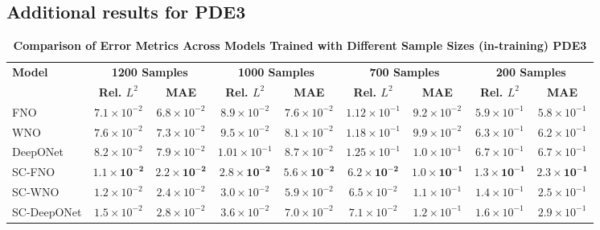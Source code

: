 \subsection*{Additional results for PDE3}

\begin{table}[htbp]
\centering
\caption{\scriptsize\textbf{Comparison of Error Metrics Across Models Trained with Different Sample Sizes (in-training) PDE3}}
\label{tab:pde3_forward_nostd}
\scriptsize
\setlength{\tabcolsep}{3pt}
\begin{tabular}{lcccccccc}
\hline
\textbf{Model} & \multicolumn{2}{c}{\textbf{1200 Samples}} & \multicolumn{2}{c}{\textbf{1000 Samples}} & \multicolumn{2}{c}{\textbf{700 Samples}} & \multicolumn{2}{c}{\textbf{200 Samples}} \\
 & \textbf{Rel. \(L^2\)} & \textbf{MAE} & \textbf{Rel. \(L^2\)} & \textbf{MAE} & \textbf{Rel. \(L^2\)} & \textbf{MAE} & \textbf{Rel. \(L^2\)} & \textbf{MAE} \\
\hline
FNO        & \(7.1 \times 10^{-2}\) & \(6.8 \times 10^{-2}\) & \(8.9 \times 10^{-2}\) & \(7.6 \times 10^{-2}\) & \(1.12 \times 10^{-1}\) & \(9.2 \times 10^{-2}\) & \(5.9 \times 10^{-1}\) & \(5.8 \times 10^{-1}\) \\
WNO        & \(7.6 \times 10^{-2}\) & \(7.3 \times 10^{-2}\) & \(9.5 \times 10^{-2}\) & \(8.1 \times 10^{-2}\) & \(1.18 \times 10^{-1}\) & \(9.9 \times 10^{-2}\) & \(6.3 \times 10^{-1}\) & \(6.2 \times 10^{-1}\) \\
DeepONet   & \(8.2 \times 10^{-2}\) & \(7.9 \times 10^{-2}\) & \(1.01 \times 10^{-1}\) & \(8.7 \times 10^{-2}\) & \(1.25 \times 10^{-1}\) & \(1.0 \times 10^{-1}\) & \(6.7 \times 10^{-1}\) & \(6.7 \times 10^{-1}\) \\
SC-FNO     & \(\mathbf{1.1 \times 10^{-2}}\) & \(\mathbf{2.2 \times 10^{-2}}\) & \(\mathbf{2.8 \times 10^{-2}}\) & \(\mathbf{5.6 \times 10^{-2}}\) & \(\mathbf{6.2 \times 10^{-2}}\) & \(\mathbf{1.0 \times 10^{-1}}\) & \(\mathbf{1.3 \times 10^{-1}}\) & \(\mathbf{2.3 \times 10^{-1}}\) \\
SC-WNO     & \(1.2 \times 10^{-2}\) & \(2.4 \times 10^{-2}\) & \(3.0 \times 10^{-2}\) & \(5.9 \times 10^{-2}\) & \(6.5 \times 10^{-2}\) & \(1.1 \times 10^{-1}\) & \(1.4 \times 10^{-1}\) & \(2.5 \times 10^{-1}\) \\
SC-DeepONet& \(1.5 \times 10^{-2}\) & \(2.8 \times 10^{-2}\) & \(3.6 \times 10^{-2}\) & \(7.0 \times 10^{-2}\) & \(7.1 \times 10^{-2}\) & \(1.2 \times 10^{-1}\) & \(1.6 \times 10^{-1}\) & \(2.9 \times 10^{-1}\) \\
\hline
\end{tabular}
\end{table}

